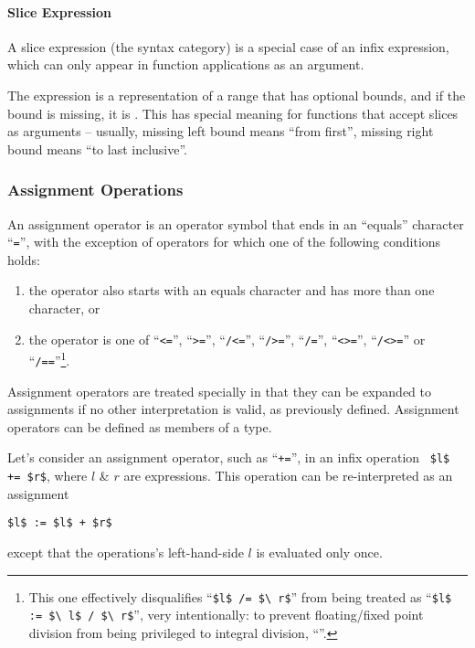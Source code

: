 \paragraph{Slice Expression}
A slice expression (the  syntax category) is a special case of an infix expression, which can only appear in function applications as an argument. 

The expression is a representation of a range that has optional bounds, and if the bound is missing, it is . This has special meaning for functions that accept slices as arguments -- usually, missing left bound means ``from first'', missing right bound means ``to last inclusive''. 




\subsubsection{Assignment Operations}
\label{sec:assignment-operations}

An assignment operator is an operator symbol that ends in an ``equals'' character ``\lstinline!=!'', with the exception of operators for which one of the following conditions holds: 
\begin{enumerate}
  \item the operator also starts with an equals character and has more than one character, or
  \item the operator is one of ``\lstinline!<=!'', ``\lstinline!>=!'', ``\lstinline!/<=!'', ``\lstinline!/>=!'', ``\lstinline!/=!'', ``\lstinline!<>=!'', ``\lstinline!/<>=!'' or ``\lstinline!/==!''\footnote{This one effectively disqualifies ``\lstinline!$l$ /= $\ r$!'' from being treated as ``\lstinline!$l$ := $\ l$ / $\ r$!'', very intentionally: to prevent floating/fixed point division from being privileged to integral division, ``''.}.
\end{enumerate}

Assignment operators are treated specially in that they can be expanded to assignments if no other interpretation is valid, as previously defined. Assignment operators can be defined as members of a type. 

Let's consider an assignment operator, such as ``\lstinline!+=!'', in an infix operation ~\lstinline!$l$ += $r$!, where $l$ \& $r$ are expressions. This operation can be re-interpreted as an assignment
\begin{lstlisting}
$l$ := $l$ + $r$
\end{lstlisting}
except that the operations's left-hand-side $l$ is evaluated only once. 

